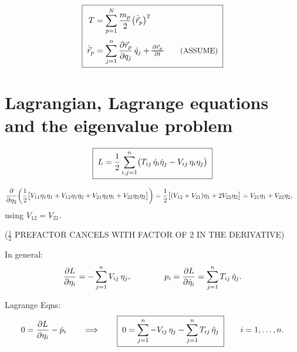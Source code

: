 \documentclass[11pt]{article}
\newcommand{\rmath}[1]{\text{\retracted{\ensuremath{#1}}}}
\begin{document}
\begin{equation*}
  \boxeq{\;
  \begin{aligned}
    T &= \sum_{p=1}^{N} \frac{m_p}{2}\bigl(\dot{\vec r}_p\bigr)^2 \\[2pt]
    \dot{\vec r}_p &= \sum_{j=1}^{n} \pd{\vec r_p}{q_j}\,\dot q_j
      + \rmath{\pd{\vec r_p}{t}}
      \qquad \text{\small(ASSUME)}
  \end{aligned}\;}
\end{equation*}

\section*{Lagrangian, Lagrange equations and the eigenvalue problem}

\begin{equation*}
  \boxed{\;
    L = \frac{1}{2}\sum_{i,j=1}^{n}
        \bigl( T_{ij}\,\dot\eta_i\dot\eta_j - V_{ij}\,\eta_i\eta_j \bigr) \;}
\end{equation*}

\begin{align*}
  \frac{\partial }{\partial \eta_2}\!\left(\frac{1}{2}\bigl[
      V_{11}\eta_1\eta_1 + V_{12}\eta_1\eta_2 + V_{21}\eta_2\eta_1 + V_{22}\eta_2\eta_2
    \bigr]\right)
  &= \frac{1}{2}\bigl[(V_{12}+V_{21})\eta_1 + 2V_{22}\eta_2\bigr]
   = V_{21}\eta_1 + V_{22}\eta_2 ,
\end{align*}
using $V_{12} = V_{21}$.
\begin{center}
  ($\tfrac{1}{2}$ PREFACTOR CANCELS WITH FACTOR OF 2 IN THE DERIVATIVE)
\end{center}

In general:
\begin{equation*}
  \frac{\partial L}{\partial \eta_i} = -\sum_{j=1}^{n} V_{ij}\,\eta_j ,
  \qquad\qquad
  p_i = \frac{\partial L}{\partial \dot\eta_i} = \sum_{j=1}^{n} T_{ij}\,\dot\eta_j .
\end{equation*}

Lagrange Eqns:
\begin{equation*}
  0 = \frac{\partial L}{\partial \eta_i} - \dot p_i
  \qquad\Longrightarrow\qquad
  \boxed{\;0 = \sum_{j=1}^{n} -V_{ij}\,\eta_j - \sum_{j=1}^{n} T_{ij}\,\ddot\eta_j\;}
  \qquad i = 1,\dots,n .
\end{equation*}

\begin{center}
\end{center}
\end{document}
